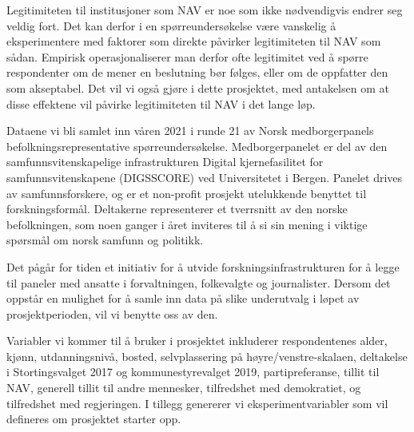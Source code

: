 \documentclass[
]{book}
\begin{document}
Legitimiteten til institusjoner som NAV er noe som ikke nødvendigvis endrer seg veldig fort.
Det kan derfor i en spørreundersøkelse være vanskelig å eksperimentere med faktorer som direkte påvirker legitimiteten til NAV som sådan.
Empirisk operasjonaliserer man derfor ofte legitimitet ved å spørre respondenter om de mener en beslutning bør følges, eller om de oppfatter den som akseptabel.
Det vil vi også gjøre i dette prosjektet, med antakelsen om at disse effektene vil påvirke legitimiteten til NAV i det lange løp.

Dataene vi bli samlet inn våren 2021 i runde 21 av Norsk medborgerpanels befolkningsrepresentative spørreundersøkelse.
Medborgerpanelet er del av den samfunnsvitenskapelige infrastrukturen Digital kjernefasilitet for samfunnsvitenskapene (DIGSSCORE) ved Universitetet i Bergen.
Panelet drives av samfunnsforskere, og er et non-profit prosjekt utelukkende benyttet til forskningsformål.
Deltakerne representerer et tverrsnitt av den norske befolkningen, som noen ganger i året inviteres til å si sin mening i viktige spørsmål om norsk samfunn og politikk.

Det pågår for tiden et initiativ for å utvide forskningsinfrastrukturen for å legge til paneler med ansatte i forvaltningen, folkevalgte og journalister.
Dersom det oppstår en mulighet for å samle inn data på slike underutvalg i løpet av prosjektperioden, vil vi benytte oss av den.

Variabler vi kommer til å bruker i prosjektet inkluderer respondentenes alder, kjønn, utdanningsnivå, bosted, selvplassering på høyre/venstre-skalaen, deltakelse i Stortingsvalget 2017 og kommunestyrevalget 2019, partipreferanse, tillit til NAV, generell tillit til andre mennesker, tilfredshet med demokratiet, og tilfredshet med regjeringen.
I tillegg genererer vi eksperimentvariabler som vil defineres om prosjektet starter opp.
\end{document}
